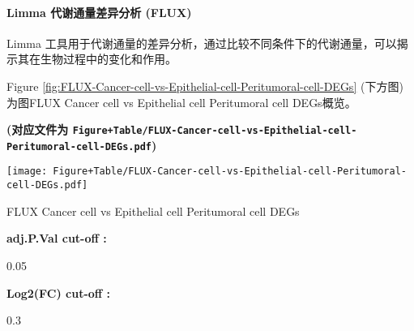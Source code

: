 \documentclass[
]{article}
\begin{document}
\begin{center}\vspace{1.5cm}\end{center}

\hypertarget{limma-ux4ee3ux8c22ux901aux91cfux5deeux5f02ux5206ux6790-flux}{%
\paragraph{Limma 代谢通量差异分析 (FLUX)}\label{limma-ux4ee3ux8c22ux901aux91cfux5deeux5f02ux5206ux6790-flux}}

Limma 工具用于代谢通量的差异分析，通过比较不同条件下的代谢通量，可以揭示其在生物过程中的变化和作用。

\begin{center}\vspace{1.5cm}\end{center}

Figure \ref{fig:FLUX-Cancer-cell-vs-Epithelial-cell-Peritumoral-cell-DEGs} (下方图) 为图FLUX Cancer cell vs Epithelial cell Peritumoral cell DEGs概览。

\textbf{(对应文件为 \texttt{Figure+Table/FLUX-Cancer-cell-vs-Epithelial-cell-Peritumoral-cell-DEGs.pdf})}

\def\@captype{figure}
\begin{center}
\texttt{[image: Figure+Table/FLUX-Cancer-cell-vs-Epithelial-cell-Peritumoral-cell-DEGs.pdf]}
\caption{FLUX Cancer cell vs Epithelial cell Peritumoral cell DEGs}\label{fig:FLUX-Cancer-cell-vs-Epithelial-cell-Peritumoral-cell-DEGs}
\end{center}

\begin{center}\vspace{1.5cm}\end{center}\begin{center}\begin{tcolorbox}[colback=gray!10, colframe=gray!50, width=0.9\linewidth, arc=1mm, boxrule=0.5pt]
\textbf{
adj.P.Val cut-off
:}

\vspace{0.5em}

    0.05

\vspace{2em}


\textbf{
Log2(FC) cut-off
:}

\vspace{0.5em}

    0.3

\vspace{2em}
\end{tcolorbox}
\end{center}
\end{document}
